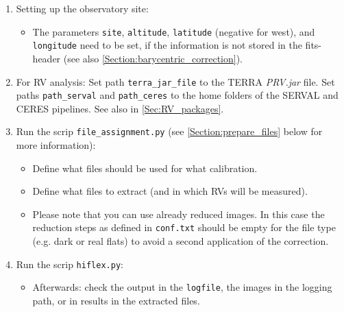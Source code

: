 \documentclass[10pt,a4paper]{article}
\begin{document}
\begin{enumerate}
  \item Setting up the observatory site: \vspace*{-\itemsep}
  \begin{itemize}[leftmargin=*]\setlength\itemsep{0em}
    \item The parameters \verb|site|, \verb|altitude|, \verb|latitude| (negative for west), and \verb|longitude| need to be set, if the information is not stored in the fits-header (see also \ref{Section:barycentric_correction}).
  \end{itemize}
  
  \item For RV analysis: Set path \verb|terra_jar_file| to the TERRA \textit{PRV.jar} file. Set paths \verb|path_serval| and \verb|path_ceres| to the home folders of the SERVAL and CERES pipelines. See also in \ref{Sec:RV_packages}.
  
  \item Run the scrip \verb|file_assignment.py| (see \ref{Section:prepare_files} below for more information): \vspace*{-\itemsep}
  \begin{itemize}[leftmargin=*]\setlength\itemsep{0em}
    \item Define what files should be used for what calibration.
    \item Define what files to extract (and in which RVs will be measured).
    \item Please note that you can use already reduced images. In this case the reduction steps as defined in \verb|conf.txt| should be empty for the file type (e.g. dark or real flats) to avoid a second application of the correction.
  \end{itemize}
  
  \item Run the scrip \verb|hiflex.py|: \vspace*{-\itemsep}
  \begin{itemize}[leftmargin=*]\setlength\itemsep{0em}
    \item Afterwards: check the output in the \verb|logfile|, the images in the logging path, or in results in the extracted files.
  \end{itemize}
  
\end{enumerate}
\end{document}
